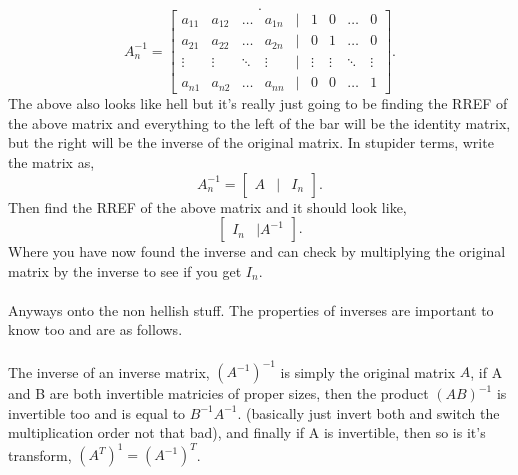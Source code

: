 \documentclass{report}
\begin{document}
\begin{multicols}{2}
\[.\] 
\[
	A^{ -1 }_n= \begin{bmatrix} a_{ 11 } & a_{ 12 } & \ldots & a_{ 1n } & \big| & 1 & 0 & \ldots & 0 \\ a_{ 21 } & a_{ 22 } & \ldots & a_{ 2n } & \big| & 0 & 1 & \ldots & 0 \\  \vdots & \vdots & \ddots & \vdots &\bigg| & \vdots & \vdots & \ddots & \vdots \\ a_{ n1 } & a_{ n2 } & \ldots & a_{ nn } & \big| & 0 & 0 & \ldots & 1 \end{bmatrix}
.\] 
The above also looks like hell but it's really just going to be finding the RREF of the above matrix and everything to the left of the bar will be the identity matrix, but the right will be the inverse of the original matrix. In stupider terms, write the matrix as,
\[
	A^{ -1 }_{ n } = \begin{bmatrix} A & \big| & I_n \end{bmatrix} 
.\] 
Then find the RREF of the above matrix and it should look like,
\[
	\begin{bmatrix} I_n & \big| A^{ -1 } \end{bmatrix} 
.\] 
Where you have now found the inverse and can check by multiplying the original matrix by the inverse to see if you get $ I_n $. \\\\
Anyways onto the non hellish stuff. The properties of inverses are important to know too and are as follows. \\ \\
The inverse of an inverse matrix, $ \left( A^{ -1 } \right) ^{ -1 } $ is simply the original matrix $ A $, if A and B are both invertible matricies of proper sizes, then the product $ \left( AB \right) ^{ -1 } $ is invertible too and is equal to $ B^{ -1 }A^{ -1 } $. (basically just invert both and switch the multiplication order not that bad), and finally if A is invertible, then so is it's transform, $ \left( A^{ T } \right) ^{ 1 } = \left( A^{ -1 } \right) ^{ T } $. 

\end{multicols}
\end{document}
